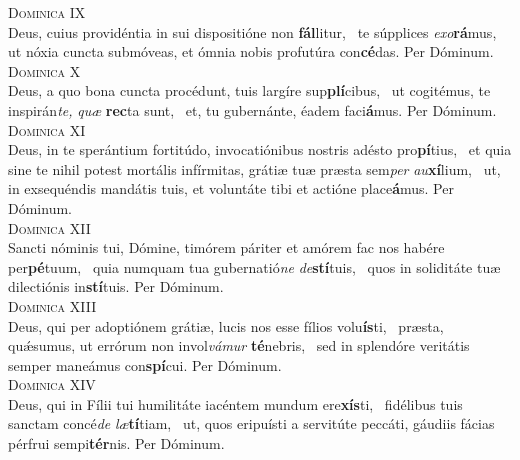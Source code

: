 \begin{translatioMulticol}{2}
{\color{red}\textsc{Dominica IX}}\\
Deus, cuius providéntia in sui dispositióne non \textbf{fál}litur,~\gredagger{}
te súpplices \textit{ex}\textit{o}\textbf{rá}mus,~\grestar{}
ut nóxia cuncta submóveas, et ómnia nobis profutúra con\textbf{cé}das. Per Dóminum.\\
{\color{red}\textsc{Dominica X}}\\
Deus, a quo bona cuncta procédunt, tuis largíre sup\textbf{plí}cibus,~\gredagger{}
ut cogitémus, te inspirán\textit{te,} \textit{quæ} \textbf{rec}ta sunt,~\grestar{}
et, tu gubernánte, éadem faci\textbf{á}mus. Per Dóminum.\\
{\color{red}\textsc{Dominica XI}}\\
Deus, in te sperántium fortitúdo, invocatiónibus nostris adésto pro\textbf{pí}tius,~\gredagger{}
et quia sine te nihil potest mortális infírmitas, grátiæ tuæ præsta sem\textit{per} \textit{au}\textbf{xí}lium,~\grestar{}
ut, in exsequéndis mandátis tuis, et voluntáte tibi et actióne place\textbf{á}mus. Per Dóminum.\\
{\color{red}\textsc{Dominica XII}}\\
Sancti nóminis tui, Dómine, timórem páriter et amórem fac nos habére per\textbf{pé}tuum,~\gredagger{}
quia numquam tua gubernatió\textit{ne} \textit{de}\textbf{stí}tuis,~\grestar{}
quos in soliditáte tuæ dilectiónis in\textbf{stí}tuis. Per Dóminum.\\
{\color{red}\textsc{Dominica XIII}}\\
Deus, qui per adoptiónem grátiæ, lucis nos esse fílios volu\textbf{ís}ti,~\gredagger{}
præsta, quǽsumus, ut errórum non invol\textit{vá}\textit{mur} \textbf{té}nebris,~\grestar{}
sed in splendóre veritátis semper maneámus con\textbf{spí}cui. Per Dóminum.\\
{\color{red}\textsc{Dominica XIV}}\\
Deus, qui in Fílii tui humilitáte iacéntem mundum ere\textbf{xís}ti,~\gredagger{}
fidélibus tuis sanctam concé\textit{de} \textit{læ}\textbf{tí}tiam,~\grestar{}
ut, quos eripuísti a servitúte peccáti, gáudiis fácias pérfrui sempi\textbf{tér}nis. Per Dóminum.
\end{translatioMulticol}

